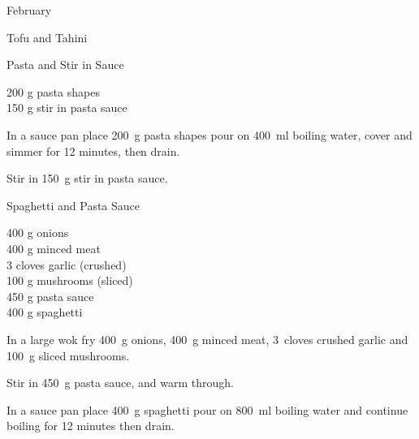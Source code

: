 \begin{menu}{February}
\begin{recipe}{2}{Tofu and Tahini}
\begin{instructions}
    \end{instructions}
    \end{recipe}%
  
    \begin{recipe}{1}{Pasta and Stir in Sauce}%
		\begin{ingredients}
		200 g pasta shapes  \\
	150 g stir in pasta sauce  \\
	
		\end{ingredients}
	
	
    \begin{instructions}
    \item 
    In a
    sauce pan
    place
    200~g  pasta shapes
    pour on
    400~ml  boiling water,
    cover and simmer for 12 minutes, then drain.
  \item 
        Stir in
        150~g  stir in pasta sauce.
      
    \end{instructions}
    \end{recipe}%
  
    \begin{recipe}{2}{Spaghetti and Pasta Sauce}%
		\begin{ingredients}
		400 g onions  \\
	400 g minced meat  \\
	3 cloves garlic (crushed) \\
	100 g mushrooms (sliced) \\
	450 g pasta sauce  \\
	400 g spaghetti  \\
	
		\end{ingredients}
	
	
	
    \begin{instructions}
    \item 
        In a large wok fry
        400~g  onions,
        400~g  minced meat,
        3~cloves crushed garlic
        and
        100~g sliced mushrooms.
      \item 
        Stir in
        450~g  pasta sauce,
        and warm through.
      \item 
    In a
    sauce pan
    place
    400~g  spaghetti
    pour on
    800~ml  boiling water and continue boiling for 12 minutes then drain.
  

\end{instructions}
\end{recipe}
\end{menu}
